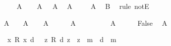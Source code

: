 \begin{isabellebody}
\ \ \isamarkupfalse%
\ {\isachardoublequoteopen}{\isasymnot}\ A{\isachardoublequoteclose}\isacommand{{\isachardot}{\isachardot}}\isamarkupfalse%
\isanewline
\ \ \isamarkupfalse%
\ {\isacharbackquoteopen}A\ {\isasymand}\ {\isasymnot}\ A{\isacharbackquoteclose}\ \isamarkupfalse%
\ {\isachardoublequoteopen}A{\isachardoublequoteclose}\isacommand{{\isachardot}{\isachardot}}\isamarkupfalse%
\isanewline
\ \ \isamarkupfalse%
\ {\isacharbackquoteopen}{\isasymnot}\ A{\isacharbackquoteclose}\ \isamarkupfalse%
\ {\isachardoublequoteopen}B{\isachardoublequoteclose}\ \isamarkupfalse%
\ {\isacharparenleft}rule\ notE{\isacharparenright}\isanewline
{}\isamarkupfalse%
%
\endisatagproof
{\isafoldproof}%
%
\isadelimproof
%
\endisadelimproof
%
\begin{isamarkuptext}%
\begin{Answer}[ref = doublenegationintroduction] \end{Answer}%
\end{isamarkuptext}\isamarkuptrue%
\isamarkupfalse%
\ {\isachardoublequoteopen}A\ {\isasymlongrightarrow}\ {\isasymnot}\ {\isasymnot}\ A{\isachardoublequoteclose}\isanewline
%
\isadelimproof
%
\endisadelimproof
%
\isatagproof
{}\isamarkupfalse%
\isanewline
\ \ \isamarkupfalse%
\ {\isachardoublequoteopen}A{\isachardoublequoteclose}\isanewline
\ \ \isamarkupfalse%
\ {\isachardoublequoteopen}{\isasymnot}\ {\isasymnot}\ A{\isachardoublequoteclose}\isanewline
\ \ \isamarkupfalse%
\isanewline
\ \ \ \ \isamarkupfalse%
\ {\isachardoublequoteopen}{\isasymnot}\ A{\isachardoublequoteclose}\isanewline
\ \ \ \ \isamarkupfalse%
\ {\isachardoublequoteopen}False{\isachardoublequoteclose}\ \isamarkupfalse%
\ {\isacharbackquoteopen}A{\isacharbackquoteclose}\isacommand{{\isachardot}{\isachardot}}\isamarkupfalse%
\isanewline
\ \ \isamarkupfalse%
\isanewline
{}\isamarkupfalse%
%
\endisatagproof
{\isafoldproof}%
%
\isadelimproof
%
\endisadelimproof
%
\begin{isamarkuptext}%
\begin{Answer}[ref = dracula] \end{Answer}%
\end{isamarkuptext}\isamarkuptrue%
\isamarkupfalse%
\ {\isachardoublequoteopen}{\isacharparenleft}{\isasymforall}\ x{\isachardot}\ R\ x\ d{\isacharparenright}\ {\isasymlongrightarrow}\ {\isacharparenleft}{\isasymforall}\ z{\isachardot}\ R\ d\ z\ {\isasymlongrightarrow}\ z\ {\isacharequal}\ m{\isacharparenright}\ {\isasymlongrightarrow}\ d\ {\isacharequal}\ m{\isachardoublequoteclose}\isanewline

\end{isabellebody}
